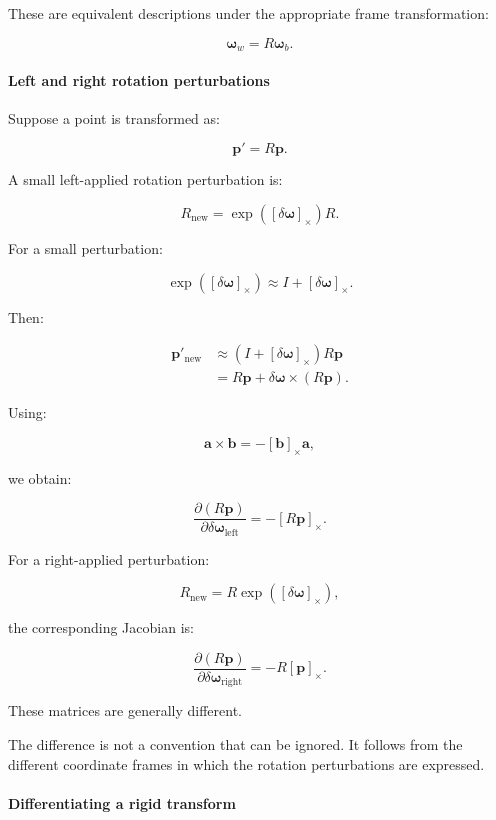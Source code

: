 These are equivalent descriptions under the appropriate frame transformation:

\[
\boldsymbol\omega_w=R\boldsymbol\omega_b.
\]

\paragraph{Left and right rotation perturbations}\label{02-foundations-ii-ch027-left-and-right-rotation-perturbations}

Suppose a point is transformed as:

\[
\mathbf p'=R\mathbf p.
\]

A small left-applied rotation perturbation is:

\[
R_{\mathrm{new}} = \exp([\delta\boldsymbol\omega]_\times)R.
\]

For a small perturbation:

\[
\exp([\delta\boldsymbol\omega]_\times) \approx I+[\delta\boldsymbol\omega]_\times.
\]

Then:

\[
\begin{aligned} \mathbf p'_{\mathrm{new}} &\approx (I+[\delta\boldsymbol\omega]_\times)R\mathbf p\\ &=R\mathbf p+ \delta\boldsymbol\omega\times(R\mathbf p). \end{aligned}
\]

Using:

\[
\mathbf a\times\mathbf b = -[\mathbf b]_\times\mathbf a,
\]

we obtain:

\[
\boxed{ \frac{\partial(R\mathbf p)} {\partial\delta\boldsymbol\omega_{\mathrm{left}}} = -[R\mathbf p]_\times }.
\]

For a right-applied perturbation:

\[
R_{\mathrm{new}} = R\exp([\delta\boldsymbol\omega]_\times),
\]

the corresponding Jacobian is:

\[
\boxed{ \frac{\partial(R\mathbf p)} {\partial\delta\boldsymbol\omega_{\mathrm{right}}} = -R[\mathbf p]_\times }.
\]

These matrices are generally different.

The difference is not a convention that can be ignored. It follows from the different coordinate frames in which the rotation perturbations are expressed.

\paragraph{Differentiating a rigid transform}\label{02-foundations-ii-ch027-differentiating-a-rigid-transform}

